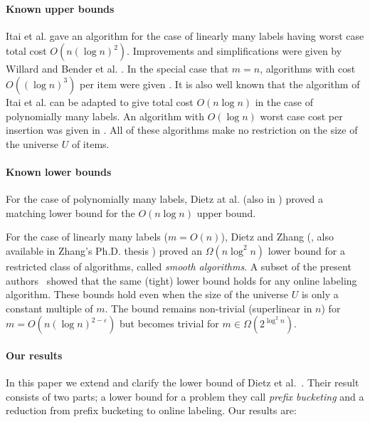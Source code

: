 \documentclass[unicode,review]{siamart1116}
\numberwithin{theorem}{section}
\begin{document}
\paragraph{Known upper bounds}
Itai et al. \cite{Itaietal} gave an algorithm for the case of linearly many labels having worst case total cost
$O(n (\log n)^2)$.  
Improvements and simplifications were given by Willard \cite{Willard} and Bender et al. \cite{Benderetal}.
In the special case that $m=n$, algorithms with cost $O((\log n)^3)$ per item were given
\cite{Zhang,BirdSadnicki}.  It is also
well known that the  algorithm of Itai et al. can be adapted to give total cost $O(n \log n)$ in the case
of polynomially many labels.   An algorithm with $O(\log n)$ worst case cost per insertion was given
in \cite{Kop12}.
All of these algorithms make no restriction on the size of the
universe $U$ of items.

\paragraph{Known lower bounds}
For the case of polynomially many labels, Dietz at al. \cite{DSZ04} (also in \cite{Zhang}) proved a matching lower bound for the $O(n \log n)$ upper bound.


For the case of linearly many labels ($m=O(n)$), Dietz and Zhang (\cite{DZ-SWAT,Dietz-manuscript}, also available in Zhang's Ph.D. thesis \cite{Zhang}) proved an $\Omega(n \log^2 n)$ lower bound for a restricted class of algorithms, called {\em smooth algorithms}.
A subset of the present authors~\cite{BKS} showed that the same (tight) lower bound holds for any online
labeling algorithm.  These bounds  hold even when the size of the universe $U$ 
is only a constant multiple of $m$.  The bound remains
non-trivial (superlinear in $n$) for
$m  = O(n (\log n)^{2-\varepsilon})$ but
becomes trivial  for $m \in \Omega(2^{\log^2 n})$.


\paragraph{Our results}
In this paper we extend and clarify the lower bound of Dietz et al.~\cite{DSZ04}. Their result consists of two parts; a lower bound for a problem they call {\em prefix bucketing}
and a reduction from prefix bucketing to online labeling.  Our results are:
\end{document}
